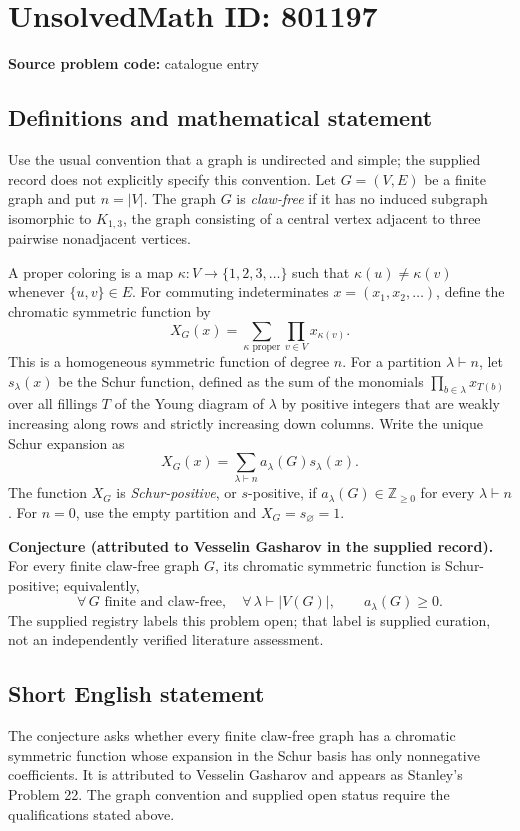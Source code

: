 \documentclass[11pt]{article}
\newcommand{\Z}{\mathbb{Z}}
\begin{document}
\section*{UnsolvedMath ID: 801197}
\textbf{Source problem code:} catalogue entry
\subsection{Definitions and mathematical statement}
Use the usual convention that a graph is undirected and simple; the supplied record does not explicitly specify this convention. Let \(G=(V,E)\) be a finite graph and put \(n=|V|\). The graph \(G\) is \emph{claw-free} if it has no induced subgraph isomorphic to \(K_{1,3}\), the graph consisting of a central vertex adjacent to three pairwise nonadjacent vertices.

A proper coloring is a map \(\kappa:V\to\{1,2,3,\ldots\}\) such that \(\kappa(u)\ne\kappa(v)\) whenever \(\{u,v\}\in E\). For commuting indeterminates \(x=(x_1,x_2,\ldots)\), define the chromatic symmetric function by
\[
X_G(x)=\sum_{\kappa\text{ proper}}\prod_{v\in V}x_{\kappa(v)}.
\]
This is a homogeneous symmetric function of degree \(n\). For a partition \(\lambda\vdash n\), let \(s_\lambda(x)\) be the Schur function, defined as the sum of the monomials \(\prod_{b\in\lambda}x_{T(b)}\) over all fillings \(T\) of the Young diagram of \(\lambda\) by positive integers that are weakly increasing along rows and strictly increasing down columns. Write the unique Schur expansion as
\[
X_G(x)=\sum_{\lambda\vdash n}a_\lambda(G)s_\lambda(x).
\]
The function \(X_G\) is \emph{Schur-positive}, or \(s\)-positive, if \(a_\lambda(G)\in\Z_{\ge0}\) for every \(\lambda\vdash n\). For \(n=0\), use the empty partition and \(X_G=s_{\varnothing}=1\).

\textbf{Conjecture (attributed to Vesselin Gasharov in the supplied record).} For every finite claw-free graph \(G\), its chromatic symmetric function is Schur-positive; equivalently,
\[
\forall\,G\text{ finite and claw-free},\quad
\forall\,\lambda\vdash |V(G)|,\qquad a_\lambda(G)\ge0.
\]
The supplied registry labels this problem open; that label is supplied curation, not an independently verified literature assessment.
\subsection{Short English statement}
The conjecture asks whether every finite claw-free graph has a chromatic symmetric function whose expansion in the Schur basis has only nonnegative coefficients. It is attributed to Vesselin Gasharov and appears as Stanley's Problem 22. The graph convention and supplied open status require the qualifications stated above.
\end{document}
